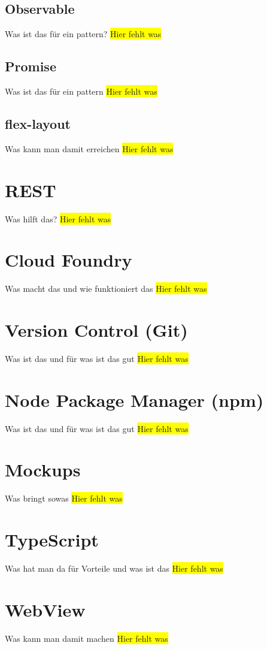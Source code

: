 \subsection{Observable}
Was ist das für ein pattern?
\colorbox{yellow}{Hier fehlt was}

\subsection{Promise}
Was ist das für ein pattern
\colorbox{yellow}{Hier fehlt was}

\subsection{flex-layout}
Was kann man damit erreichen
\colorbox{yellow}{Hier fehlt was}

\section{REST}
Was hilft das?
\colorbox{yellow}{Hier fehlt was}

\section{Cloud Foundry}
Was macht das und wie funktioniert das
\colorbox{yellow}{Hier fehlt was}

\section{Version Control (Git)}
Was ist das und für was ist das gut
\colorbox{yellow}{Hier fehlt was}

\section{Node Package Manager (npm)}
Was ist das und für was ist das gut
\colorbox{yellow}{Hier fehlt was}

\section{Mockups}
Was bringt sowas
\colorbox{yellow}{Hier fehlt was}

\section{TypeScript}
Was hat man da für Vorteile und was ist das
\colorbox{yellow}{Hier fehlt was}

\section{WebView}
Was kann man damit machen
\colorbox{yellow}{Hier fehlt was}